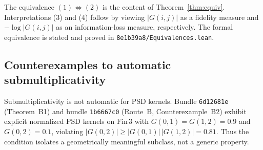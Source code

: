 \documentclass[11pt,a4paper]{article}
\theoremstyle{definition}
\theoremstyle{remark}
\begin{document}
The equivalence $(1) \Leftrightarrow (2)$ is the content of Theorem~\ref{thm:equiv}. Interpretations (3) and (4) follow by viewing $|G(i,j)|$ as a fidelity measure and $-\log|G(i,j)|$ as an information-loss measure, respectively. The formal equivalence is stated and proved in \texttt{8e1b39a8/Equivalences.lean}.

\subsection{Counterexamples to automatic submultiplicativity}

Submultiplicativity is not automatic for PSD kernels. Bundle \texttt{6d12681e} (Theorem~B1) and bundle \texttt{1b6667c0} (Route~B, Counterexample~B2) exhibit explicit normalized PSD kernels on $\mathrm{Fin}\,3$ with $G(0,1) = G(1,2) = 0.9$ and $G(0,2) = 0.1$, violating $|G(0,2)| \ge |G(0,1)|\,|G(1,2)| = 0.81$. Thus the condition isolates a geometrically meaningful subclass, not a generic property.
\end{document}
